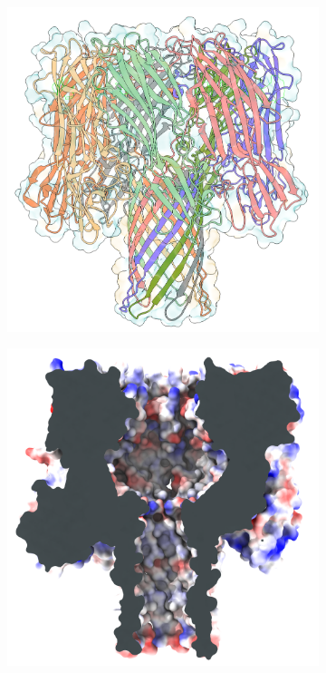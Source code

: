 \begin{figure}[ht]
  \begin{centering}
  \begin{subfigure}[t]{\dimexpr.3\linewidth-1.3em\relax}
  \centering
  \includegraphics[width=\linewidth,valign=t]{Figures/ahl-front-c.png}
  \end{subfigure}%
  \begin{subfigure}[t]{\dimexpr.3\linewidth-1.3em\relax}
  \centering
  \includegraphics[width=\linewidth,valign=t]{Figures/ahl-elec.png}
  \end{subfigure}%


\end{centering}
\end{figure}
